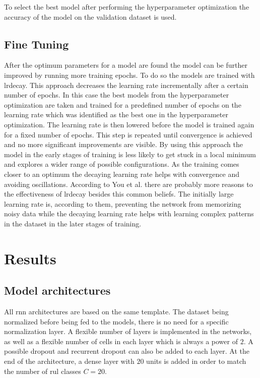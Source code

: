\documentclass[conference]{IEEEtran}
\begin{document}
To select the best model after performing the hyperparameter optimization the accuracy of the model on the validation dataset is used.

\subsection{Fine Tuning}
\label{sec:fine_tuning}

After the optimum parameters for a model are found the model can be further improved by running more training epochs. To do so the models are trained with \gls{lrdecay}. This approach decreases the learning rate incrementally after a certain number of epochs.
In this case the best models from the hyperparameter optimization are taken and trained for a predefined number of epochs on the learning rate which was identified as the best one in the hyperparameter optimization. The learning rate is then lowered before the model is trained again for a fixed number of epochs. This step is repeated until convergence is achieved and no more significant improvements are visible. By using this approach the model in the early stages of training is less likely to get stuck in a local minimum and explores a wider range of possible configurations. As the training comes closer to an optimum the decaying learning rate helps with convergence and avoiding oscillations. According to You et al. \cite{You2019} there are probably more reasons to the effectiveness of \gls{lrdecay} besides this common beliefs. The initially large learning rate is, according to them, preventing the network from memorizing noisy data while the decaying learning rate helps with learning complex patterns in the dataset in the later stages of training.

\section{Results}
\label{sec:results}

\subsection{Model architectures}
\label{sec:model_architectures}

All \gls{rnn} architectures are based on the same template. The dataset being normalized before being fed to the models, there is no need for a specific normalization layer. A flexible number of layers is implemented in the networks, as well as a flexible number of cells in each layer which is always a power of $ 2 $. A possible dropout and recurrent dropout can also be added to each layer. At the end of the architecture, a dense layer with $ 20 $ units is added in order to match the number of \gls{rul} classes $ C = 20 $.  
\end{document}
